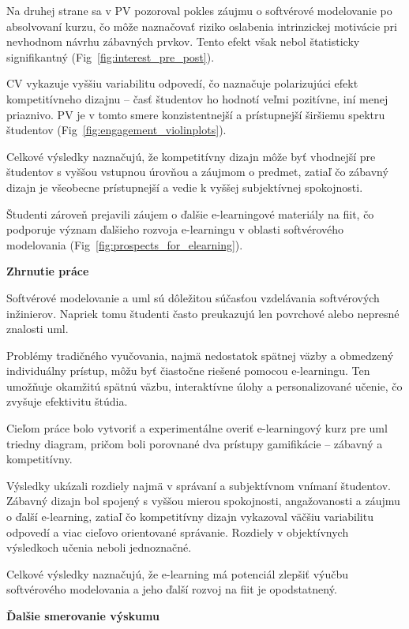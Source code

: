 Na druhej strane sa v PV pozoroval pokles záujmu o softvérové modelovanie po absolvovaní kurzu, čo môže naznačovať riziko oslabenia intrinzickej motivácie pri nevhodnom návrhu zábavných prvkov. Tento efekt však nebol štatisticky signifikantný (Fig~\ref{fig:interest_pre_post}).

CV vykazuje vyššiu variabilitu odpovedí, čo naznačuje polarizujúci efekt kompetitívneho dizajnu – časť študentov ho hodnotí veľmi pozitívne, iní menej priaznivo. PV je v tomto smere konzistentnejší a prístupnejší širšiemu spektru študentov (Fig~\ref{fig:engagement_violinplots}). 

Celkové výsledky naznačujú, že kompetitívny dizajn môže byť vhodnejší pre študentov s vyššou vstupnou úrovňou a záujmom o predmet, zatiaľ čo zábavný dizajn je všeobecne prístupnejší a vedie k vyššej subjektívnej spokojnosti.

Študenti zároveň prejavili záujem o ďalšie e-learningové materiály na \ac{fiit}, čo podporuje význam ďalšieho rozvoja e-learningu v oblasti softvérového modelovania (Fig~\ref{fig:prospects_for_elearning}).

\textbf{Zhrnutie práce}

Softvérové modelovanie a \ac{uml} sú dôležitou súčasťou vzdelávania softvérových inžinierov. Napriek tomu študenti často preukazujú len povrchové alebo nepresné znalosti \ac{uml}.

Problémy tradičného vyučovania, najmä nedostatok spätnej väzby a obmedzený individuálny prístup, môžu byť čiastočne riešené pomocou e-learningu. Ten umožňuje okamžitú spätnú väzbu, interaktívne úlohy a personalizované učenie, čo zvyšuje efektivitu štúdia.

Cieľom práce bolo vytvoriť a experimentálne overiť e-learningový kurz pre \ac{uml} triedny diagram, pričom boli porovnané dva prístupy gamifikácie – zábavný a kompetitívny.

Výsledky ukázali rozdiely najmä v správaní a subjektívnom vnímaní študentov. Zábavný dizajn bol spojený s vyššou mierou spokojnosti, angažovanosti a záujmu o ďalší e-learning, zatiaľ čo kompetitívny dizajn vykazoval väčšiu variabilitu odpovedí a viac cieľovo orientované správanie. Rozdiely v objektívnych výsledkoch učenia neboli jednoznačné.

Celkové výsledky naznačujú, že e-learning má potenciál zlepšiť výučbu softvérového modelovania a jeho ďalší rozvoj na \ac{fiit} je opodstatnený.

\textbf{Ďalšie smerovanie výskumu}


